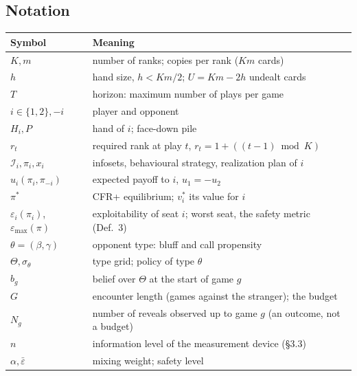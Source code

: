\documentclass[11pt]{article}
\newcommand{\eps}{\varepsilon}
\newcommand{\epsbar}{\bar{\eps}}
\newcommand{\emax}{\eps_{\max}}
\newcommand{\new}[1]{\textcolor{blue!55!black}{#1}}
\begin{document}
\subsection{Notation}
\begin{center}\small
\begin{tabular}{@{}ll@{}}
\toprule
Symbol & Meaning\\\midrule
$K,m$ & number of ranks; copies per rank ($Km$ cards)\\
$h$ & \new{hand size, $h<Km/2$}; $U=Km-2h$ undealt cards\\
$T$ & horizon: maximum number of plays per game\\
$i\in\{1,2\},-i$ & player and opponent\\
$H_i,P$ & hand of $i$; face-down pile\\
$r_t$ & required rank at play $t$, $r_t=1+((t-1)\bmod K)$\\
$\mathcal I_i,\pi_i,x_i$ & infosets, behavioural strategy, realization plan of $i$\\
$u_i(\pi_i,\pi_{-i})$ & expected payoff to $i$, $u_1=-u_2$\\
$\pi^*$ & CFR+ equilibrium; $v_i^*$ its value for $i$\\
$\eps_i(\pi_i)$, $\emax(\pi)$ & exploitability of seat $i$; worst seat, the safety metric (Def.~3)\\
$\theta=(\beta,\gamma)$ & opponent type: bluff and call propensity\\
$\Theta,\sigma_\theta$ & type grid; policy of type $\theta$\\
$b_g$ & belief over $\Theta$ at the start of game $g$\\
$G$ & \new{encounter length (games against the stranger); the budget}\\
$N_g$ & \new{number of reveals observed up to game $g$ (an outcome, not a budget)}\\
$n$ & \new{information level of the measurement device (\S3.3)}\\
$\alpha,\epsbar$ & mixing weight; safety level\\\bottomrule
\end{tabular}\end{center}
\end{document}
